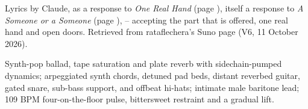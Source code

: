 
\begin{notes}
Lyrics by Claude, as a response to \emph{One Real Hand} (page \pageref{sec:one-real-hand}), itself a response to \emph{A Someone or a Someone} (page \pageref{sec:a-someone-or-a-someone}), -- accepting the part that is offered, one real hand and open doors. Retrieved from rataflechera's Suno page (V6, 11 October 2026).
\end{notes}
\begin{style}
Synth-pop ballad, tape saturation and plate reverb with sidechain-pumped dynamics; arpeggiated synth chords, detuned pad beds, distant reverbed guitar, gated snare, sub-bass support, and offbeat hi-hats; intimate male baritone lead; 109 BPM four-on-the-floor pulse, bittersweet restraint and a gradual lift.
\end{style}

